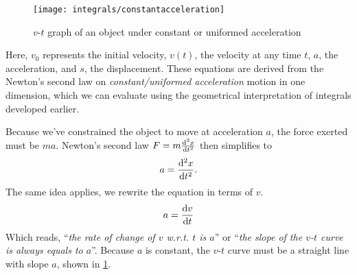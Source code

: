 \begin{figure}[b]
    \centering
    \texttt{[image: integrals/constantacceleration]}
    \caption{$v$-$t$ graph of an object under constant or uniformed acceleration}
    \label{fig:vtconstantacceleration}
\end{figure}
Here, $v_0$ represents the initial velocity, $v(t)$, the velocity at any time $t$, $a$, the acceleration, and $s$, the displacement. These equations are derived from the Newton's second law on \emph{constant/uniformed acceleration} motion in one dimension, which we can evaluate using the geometrical interpretation of integrals developed earlier.

Because we've constrained the object to move at acceleration $a$, the force exerted must be $ma$. Newton's second law $F = m\dv[2]{x}{t}$ then simplifies to
\begin{equation*}
    a = \dv[2]{x}{t}.
\end{equation*}
The same idea applies, we rewrite the equation in terms of $v$.
\begin{equation}
    a = \dv{v}{t} \label{eq:linearmotionintermediate}
\end{equation}
Which reads, ``\emph{the rate of change of $v$ w.r.t. $t$ is $a$}'' or ``\emph{the slope of the $v$-$t$ curve is always equals to $a$}''. Because $a$ is constant, the $v$-$t$ curve must be a straight line with slope $a$, shown in \cref{fig:vtconstantacceleration}.

